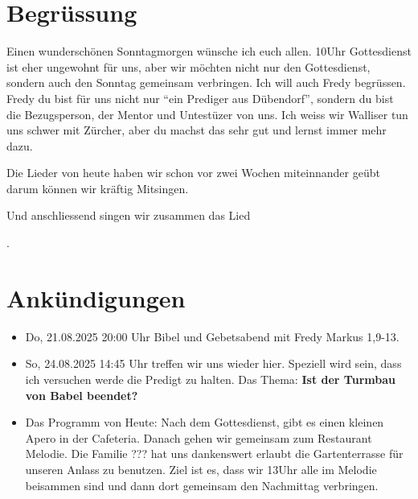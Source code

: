 \documentclass{../../inc/mybib}
\begin{document}
\section{Begrüssung}
Einen wunderschönen Sonntagmorgen wünsche ich euch allen. 10Uhr Gottesdienst ist eher ungewohnt für uns, aber wir möchten nicht nur den Gottesdienst, sondern auch den Sonntag gemeinsam verbringen. Ich will auch Fredy begrüssen. Fredy du bist für uns nicht nur \enquote{ein Prediger aus Dübendorf}, sondern du bist die Bezugsperson, der Mentor und Untestüzer von uns. Ich weiss wir Walliser tun uns schwer mit Zürcher, aber du machst das sehr gut und lernst immer mehr dazu.

Die Lieder von heute haben wir schon vor zwei Wochen miteinnander geübt darum können wir kräftig Mitsingen.

\beten{} Und anschliessend singen wir zusammen das Lied

{}.

\section{Ankündigungen}
\begin{itemize}
    \item {} Do, 21.08.2025 20:00 Uhr Bibel und Gebetsabend mit Fredy  Markus 1,9-13.
    \item {} So, 24.08.2025 14:45 Uhr treffen wir uns wieder hier. Speziell wird sein, dass ich versuchen werde die Predigt zu halten. Das Thema: \textbf{Ist der Turmbau von Babel beendet?}
    \item {} Das Programm von Heute: Nach dem Gottesdienst, gibt es einen kleinen Apero in der Cafeteria. Danach gehen wir gemeinsam zum Restaurant Melodie. Die Familie ??? hat uns dankenswert erlaubt die Gartenterrasse für unseren Anlass zu benutzen.
    Ziel ist es, dass wir 13Uhr alle im Melodie beisammen sind und dann dort gemeinsam den Nachmittag verbringen.
\end{itemize}
\end{document}

